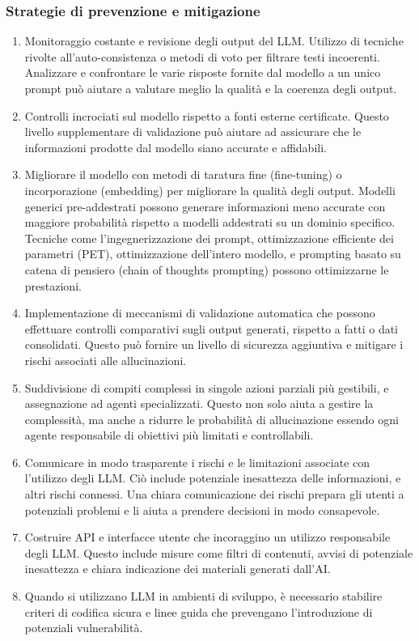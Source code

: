 \documentclass[
]{article}
\providecommand{\tightlist}{%
  \setlength{\itemsep}{0pt}\setlength{\parskip}{0pt}}
\begin{document}
\subsubsection{Strategie di prevenzione e
mitigazione}\label{strategie-di-prevenzione-e-mitigazione}

\begin{enumerate}
\def\labelenumi{\arabic{enumi}.}
\tightlist
\item
  Monitoraggio costante e revisione degli output del LLM. Utilizzo di
  tecniche rivolte all'auto-consistenza o metodi di voto per filtrare
  testi incoerenti. Analizzare e confrontare le varie risposte fornite
  dal modello a un unico prompt può aiutare a valutare meglio la qualità
  e la coerenza degli output.
\item
  Controlli incrociati sul modello rispetto a fonti esterne certificate.
  Questo livello supplementare di validazione può aiutare ad assicurare
  che le informazioni prodotte dal modello siano accurate e affidabili.
\item
  Migliorare il modello con metodi di taratura fine (fine-tuning) o
  incorporazione (embedding) per migliorare la qualità degli output.
  Modelli generici pre-addestrati possono generare informazioni meno
  accurate con maggiore probabilità rispetto a modelli addestrati su un
  dominio specifico. Tecniche come l'ingegnerizzazione dei prompt,
  ottimizzazione efficiente dei parametri (PET), ottimizzazione
  dell'intero modello, e prompting basato su catena di pensiero (chain
  of thoughts prompting) possono ottimizzarne le prestazioni.
\item
  Implementazione di meccanismi di validazione automatica che possono
  effettuare controlli comparativi sugli output generati, rispetto a
  fatti o dati consolidati. Questo può fornire un livello di sicurezza
  aggiuntiva e mitigare i rischi associati alle allucinazioni.
\item
  Suddivisione di compiti complessi in singole azioni parziali più
  gestibili, e assegnazione ad agenti specializzati. Questo non solo
  aiuta a gestire la complessità, ma anche a ridurre le probabilità di
  allucinazione essendo ogni agente responsabile di obiettivi più
  limitati e controllabili.
\item
  Comunicare in modo trasparente i rischi e le limitazioni associate con
  l'utilizzo degli LLM. Ciò include potenziale inesattezza delle
  informazioni, e altri rischi connessi. Una chiara comunicazione dei
  rischi prepara gli utenti a potenziali problemi e li aiuta a prendere
  decisioni in modo consapevole.
\item
  Costruire API e interfacce utente che incoraggino un utilizzo
  responsabile degli LLM. Questo include misure come filtri di
  contenuti, avvisi di potenziale inesattezza e chiara indicazione dei
  materiali generati dall'AI.
\item
  Quando si utilizzano LLM in ambienti di sviluppo, è necessario
  stabilire criteri di codifica sicura e linee guida che prevengano
  l'introduzione di potenziali vulnerabilità.
\end{enumerate}
\end{document}
